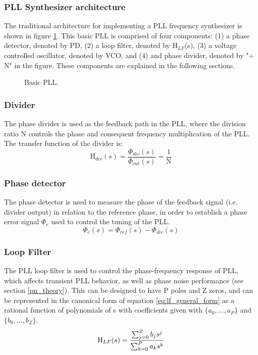 		\subsubsection{PLL Synthesizer architecture}
			The traditional architecture for implementing a PLL frequency synthesizer \cite{Razavi1996DesignOM} is shown in figure \ref{fig:basic_pll}. This basic PLL is comprised of four components: (1) a phase detector, denoted by PD, (2) a loop filter, denoted by H$_{LF}$(s), (3) a voltage controlled oscillator, denoted by VCO, and (4) and phase divider, denoted by "$\div$ N" in the figure. These components are explained in the following sections.
			\begin{figure}[htb!]
				\center
				\caption{Basic PLL.}
				\label{fig:basic_pll}
			\end{figure}
			\FloatBarrier

		\subsubsection{Divider}
			The phase divider is used as the feedback path in the PLL, where the division ratio N controls the phase and consequent frequency multiplication of the PLL. The transfer function of the divider is:
			\begin{equation}
				\mathrm{H}_{div}(s) = \frac{\Phi_{div}(s)}{\Phi_{out}(s)} = \frac{1}{\mathrm{N}}
			\end{equation}

			\subsubsection{Phase detector}
			The phase detector is used to measure the phase of the feedback signal (i.e. divider output) in relation to the reference phase, in order to establish a phase error signal $\Phi_e$ used to control the tuning of the PLL.
			\begin{equation}
				\Phi_e(s) = \Phi_{ref}(s) - \Phi_{div}(s)
			\end{equation}

		\subsubsection{Loop Filter}
			The PLL loop filter is used to control the phase-frequency response of PLL, which affects transient PLL behavior, as well as phase noise performance (see section \ref{pn_theory}). This can be designed to have P poles and Z zeros, and can be represented in the canonical form of equation \ref{eq:lf_general_form} as a rational function of polynomials of s with coefficients given with $\{a_0, ..., a_P\}$ and $\{b_0, ..., b_Z\}$.
			\begin{equation} \label{eq:lf_general_form}
				\textnormal{H}_{LF}(s) = \frac{\sum_{j=0}^Z b_js^j}{\sum_{k=0}^P a_ks^k}
			\end{equation}
			
